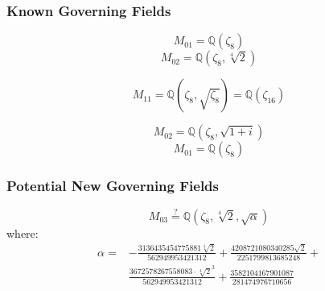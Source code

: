 \documentclass[12pt]{beamer}
\begin{document}
	\begin{frame}
		\frametitle{Known Governing Fields}
		$$M_{01} = \mathbb{Q}\left( \zeta_8 \right)$$
		$$M_{02} = \mathbb{Q}\left( \zeta_8, \sqrt[4]{2} \right)$$
		
		$$
		M_{11}
		= \mathbb{Q}\left( \zeta_8, \sqrt{\zeta_8} \right)
		= \mathbb{Q}\left( \zeta_{16} \right)
		$$
		
		$$M_{02} = \mathbb{Q}\left(\zeta_8, \sqrt{1+i} \right)$$
		$$M_{01} = \mathbb{Q}\left(\zeta_8\right)$$
	\end{frame}
	\begin{frame}
		\frametitle{Potential New Governing Fields}
		$$M_{03} \stackrel{?}{=} \mathbb{Q}\left(\zeta_8, \sqrt[4]{2}, \sqrt{\alpha}\right)$$
		where:
		\begin{align*}
			\alpha =
			&- \frac{3136435454775881 \sqrt[4]{2}}{562949953421312} + \frac{4208721080340285 \sqrt{2}}{2251799813685248} +\\
			&\frac{3672578267558083 \cdot \sqrt[4]{2}^3}{562949953421312} + \frac{3582104167901087}{281474976710656}
		\end{align*}
	\end{frame}
\end{document}
